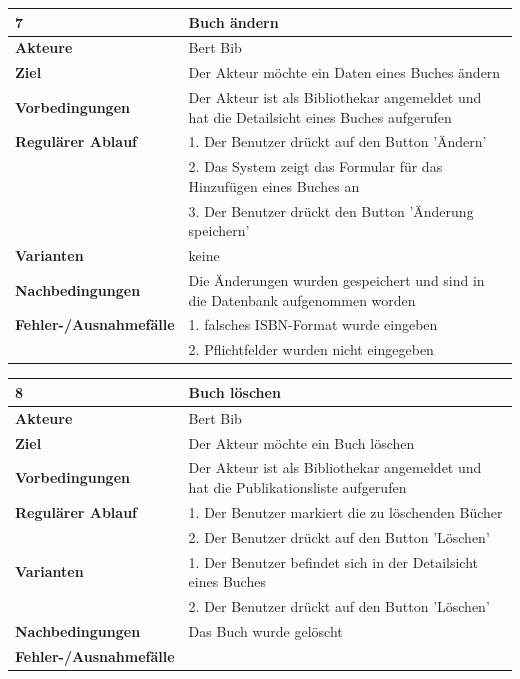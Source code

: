 \documentclass[fontsize=12pt,paper=a4,twoside]{scrartcl}
\begin{document}
\begin{table}[htbp]
\label{7}
\begin{tabular}{|l|p{10cm}|}
\hline 
\textbf{7} & \textbf{Buch ändern} \\ \hline
\textbf{Akteure} & Bert Bib\\ \hline
\textbf{Ziel} & Der Akteur möchte ein Daten eines Buches ändern \\ \hline
\textbf{Vorbedingungen} & Der Akteur ist als Bibliothekar angemeldet und hat die Detailsicht eines Buches aufgerufen  \\ \hline
\textbf{Regulärer Ablauf} & 
1. Der Benutzer drückt auf den Button 'Ändern' \\
&2. Das System zeigt das Formular für das Hinzufügen eines Buches an\\
&3. Der Benutzer drückt den Button 'Änderung speichern'\\
\hline
\textbf{Varianten} & 
keine \\ \hline
\textbf{Nachbedingungen} & Die Änderungen wurden gespeichert und sind in die Datenbank aufgenommen worden\\ \hline
\textbf{Fehler-/Ausnahmefälle} & 1. falsches ISBN-Format wurde eingeben\\
&2. Pflichtfelder wurden nicht eingegeben\\
\hline
\end{tabular}
\end{table}

\begin{table}[htbp]
\label{8}
\begin{tabular}{|l|p{10cm}|}
\hline 
\textbf{8} & \textbf{Buch löschen} \\ \hline
\textbf{Akteure} & Bert Bib\\ \hline
\textbf{Ziel} & Der Akteur möchte ein Buch löschen \\ \hline
\textbf{Vorbedingungen} & Der Akteur ist als Bibliothekar angemeldet und hat die Publikationsliste aufgerufen  \\ \hline
\textbf{Regulärer Ablauf} & 
1. Der Benutzer markiert die zu löschenden Bücher\\
&2. Der Benutzer drückt auf den Button 'Löschen' \\
\hline
\textbf{Varianten} & 
1. Der Benutzer befindet sich in der Detailsicht eines Buches\\
&2. Der Benutzer drückt auf den Button 'Löschen' \\ \hline
\textbf{Nachbedingungen} & Das Buch wurde gelöscht \\ \hline
\textbf{Fehler-/Ausnahmefälle} & \\
\hline
\end{tabular}
\end{table}
\end{document}
